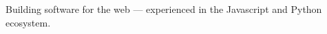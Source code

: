 

\begin{cvparagraph}

Building software for the web — experienced in the Javascript and Python ecosystem.
\end{cvparagraph}
